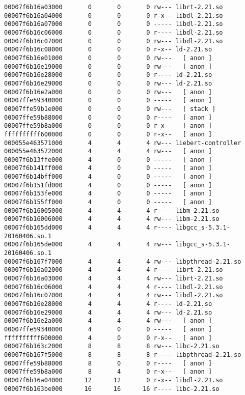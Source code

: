 \begin{verbatim}
00007f6b16a03000       0       0       0 rw--- librt-2.21.so
00007f6b16a04000       0       0       0 r-x-- libdl-2.21.so
00007f6b16a07000       0       0       0 ----- libdl-2.21.so
00007f6b16c06000       0       0       0 r---- libdl-2.21.so
00007f6b16c07000       0       0       0 rw--- libdl-2.21.so
00007f6b16c08000       0       0       0 r-x-- ld-2.21.so
00007f6b16e01000       0       0       0 rw---   [ anon ]
00007f6b16e19000       0       0       0 rw---   [ anon ]
00007f6b16e28000       0       0       0 r---- ld-2.21.so
00007f6b16e29000       0       0       0 rw--- ld-2.21.so
00007f6b16e2a000       0       0       0 rw---   [ anon ]
00007ffe59340000       0       0       0 -----   [ anon ]
00007ffe59b1e000       0       0       0 rw---   [ stack ]
00007ffe59b88000       0       0       0 r----   [ anon ]
00007ffe59b8a000       0       0       0 r-x--   [ anon ]
ffffffffff600000       0       0       0 r-x--   [ anon ]
000055e463571000       4       4       4 rw--- liebert-controller
000055e463572000       4       4       4 rw---   [ anon ]
00007f6b13ffe000       4       0       0 -----   [ anon ]
00007f6b141ff000       4       0       0 -----   [ anon ]
00007f6b14bff000       4       0       0 -----   [ anon ]
00007f6b151fd000       4       0       0 -----   [ anon ]
00007f6b153fe000       4       0       0 -----   [ anon ]
00007f6b155ff000       4       0       0 -----   [ anon ]
00007f6b16005000       4       4       4 r---- libm-2.21.so
00007f6b16006000       4       4       4 rw--- libm-2.21.so
00007f6b165dd000       4       4       4 r---- libgcc_s-5.3.1-20160406.so.1
00007f6b165de000       4       4       4 rw--- libgcc_s-5.3.1-20160406.so.1
00007f6b167f7000       4       4       4 rw--- libpthread-2.21.so
00007f6b16a02000       4       4       4 r---- librt-2.21.so
00007f6b16a03000       4       4       4 rw--- librt-2.21.so
00007f6b16c06000       4       4       4 r---- libdl-2.21.so
00007f6b16c07000       4       4       4 rw--- libdl-2.21.so
00007f6b16e28000       4       4       4 r---- ld-2.21.so
00007f6b16e29000       4       4       4 rw--- ld-2.21.so
00007f6b16e2a000       4       4       4 rw---   [ anon ]
00007ffe59340000       4       0       0 -----   [ anon ]
ffffffffff600000       4       0       0 r-x--   [ anon ]
00007f6b163c2000       8       8       8 rw--- libc-2.21.so
00007f6b167f5000       8       8       8 r---- libpthread-2.21.so
00007ffe59b88000       8       0       0 r----   [ anon ]
00007ffe59b8a000       8       4       0 r-x--   [ anon ]
00007f6b16a04000      12      12       0 r-x-- libdl-2.21.so
00007f6b163be000      16      16      16 r---- libc-2.21.so

\end{verbatim}
